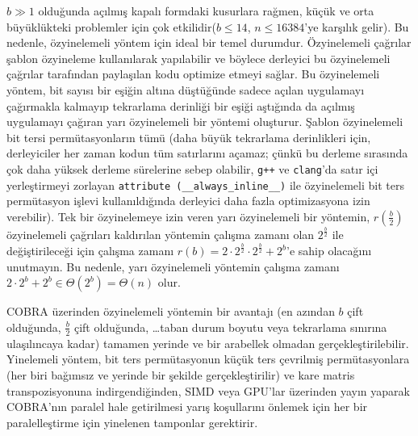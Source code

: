 \documentclass[10pt]{article}
\begin{document}
$b \gg 1$ oldu\u{g}unda a\c{c}{\i}lm{\i}\c{s} kapal{\i} formdaki kusurlara ra\u{g}men, k\"{u}\c{c}\"{u}k ve
orta b\"{u}y\"{u}kl\"{u}kteki problemler i\c{c}in \c{c}ok etkilidir($b \leq 14$, $n \leq 16384$'ye kar\c{s}{\i}l{\i}k gelir).
Bu nedenle, \"{o}zyinelemeli y\"{o}ntem i\c{c}in ideal bir temel durumdur. 
\"{O}zyinelemeli \c{c}a\u{g}r{\i}lar \c{s}ablon \"{o}zyineleme kullan{\i}larak yap{\i}labilir ve b\"{o}ylece 
derleyici bu \"{o}zyinelemeli \c{c}a\u{g}r{\i}lar taraf{\i}ndan payla\c{s}{\i}lan kodu optimize etmeyi sa\u{g}lar. 
Bu \"{o}zyinelemeli y\"{o}ntem, bit say{\i}s{\i} bir e\c{s}i\u{g}in alt{\i}na d\"{u}\c{s}t\"{u}\u{g}\"{u}nde sadece a\c{c}{\i}lan uygulamay{\i}
\c{c}a\u{g}{\i}rmakla kalmay{\i}p tekrarlama derinli\u{g}i bir e\c{s}i\u{g}i a\c{s}t{\i}\u{g}{\i}nda da a\c{c}{\i}lm{\i}\c{s} uygulamay{\i} 
\c{c}a\u{g}{\i}ran yar{\i} \"{o}zyinelemeli bir y\"{o}ntemi olu\c{s}turur. \c{S}ablon \"{o}zyinelemeli bit tersi 
perm\"{u}tasyonlar{\i}n t\"{u}m\"{u} (daha b\"{u}y\"{u}k tekrarlama derinlikleri i\c{c}in, derleyiciler her 
zaman kodun t\"{u}m sat{\i}rlar{\i}n{\i} a\c{c}amaz; \c{c}\"{u}nk\"{u} bu derleme s{\i}ras{\i}nda \c{c}ok daha y\"{u}ksek 
derleme s\"{u}relerine sebep olabilir, {\tt g++} ve {\tt clang}'da sat{\i}r i\c{c}i
yerle\c{s}tirmeyi zorlayan {\tt attribute~(\_\_always\_inline\_\_)} ile \"{o}zyinelemeli
bit ters perm\"{u}tasyon i\c{s}levi kullan{\i}ld{\i}\u{g}{\i}nda derleyici daha fazla optimizasyona 
izin verebilir). Tek bir \"{o}zyinelemeye izin veren yar{\i} \"{o}zyinelemeli bir y\"{o}ntemin,
$r(\frac{b}{2})$ \"{o}zyinelemeli \c{c}a\u{g}r{\i}lar{\i} kald{\i}r{\i}lan y\"{o}ntemin \c{c}al{\i}\c{s}ma zaman{\i} olan
$2^{\frac{b}{2}}$ ile de\u{g}i\c{s}tirilece\u{g}i i\c{c}in \c{c}al{\i}\c{s}ma zaman{\i} 
$r(b) = 2 \cdot 2^{\frac{b}{2}} \cdot 2^{\frac{b}{2}} + 2^b$'e sahip 
olaca\u{g}{\i}n{\i} unutmay{\i}n. Bu nedenle, yar{\i} \"{o}zyinelemeli y\"{o}ntemin \c{c}al{\i}\c{s}ma 
zaman{\i} $2\cdot 2^b + 2^b \in \Theta(2^b) = \Theta(n)$ olur.

COBRA \"{u}zerinden \"{o}zyinelemeli y\"{o}ntemin bir avantaj{\i} (en az{\i}ndan 
$b$ \c{c}ift oldu\u{g}unda, $\frac{b}{2}$ \c{c}ift oldu\u{g}unda, \ldots taban durum
boyutu veya tekrarlama s{\i}n{\i}r{\i}na ula\c{s}{\i}l{\i}ncaya kadar) tamamen yerinde 
ve bir arabellek olmadan ger\c{c}ekle\c{s}tirilebilir. Yinelemeli y\"{o}ntem, bit 
ters perm\"{u}tasyonun k\"{u}\c{c}\"{u}k ters \c{c}evrilmi\c{s} perm\"{u}tasyonlara 
(her biri ba\u{g}{\i}ms{\i}z ve yerinde bir \c{s}ekilde ger\c{c}ekle\c{s}tirilir) ve 
kare matris transpozisyonuna indirgendi\u{g}inden, SIMD veya GPU'lar \"{u}zerinden yay{\i}n yaparak 
COBRA'n{\i}n paralel hale getirilmesi yar{\i}\c{s} ko\c{s}ullar{\i}n{\i} \"{o}nlemek 
i\c{c}in her bir paralelle\c{s}tirme i\c{c}in yinelenen tamponlar gerektirir.\newline
\end{document}
